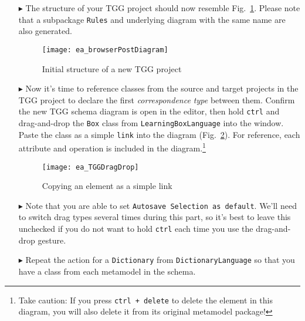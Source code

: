 \begin{itemize}
\item[$\blacktriangleright$] The structure of your TGG project should now resemble Fig.~\ref{ea:new_tgg_project}. Please note that a subpackage \texttt{Rules}
and underlying diagram with the same name are also generated.

\begin{figure}[htbp]
\begin{center}
  \texttt{[image: ea\_browserPostDiagram]}
  \caption{Initial structure of a new TGG project}  
  \label{ea:new_tgg_project}
\end{center}
\end{figure}
\end{itemize}
\clearpage

\begin{itemize}

\item[$\blacktriangleright$] Now it's time to reference classes from the source and target projects in the TGG project to declare the first \emph{correspondence
type} between them. Confirm the new TGG schema diagram is open in the editor, then hold \texttt{ctrl} and drag-and-drop the \texttt{Box} class from
\texttt{Learning\-Box\-Language} into the window. Paste the class as a simple \texttt{link} into the diagram (Fig.~\ref{ea:TGGdragDrop}). For reference, each
attribute and operation is included in the diagram.\footnote{Take caution: If you press \texttt{ctrl + delete} to delete the element in this diagram,
you will also delete it from its original metamodel package!}

\vspace{0.5cm}

\begin{figure}[htbp]
\begin{center}
  \texttt{[image: ea\_TGGDragDrop]}
  \caption{Copying an element as a simple link} 
  \label{ea:TGGdragDrop}
\end{center}
\end{figure}

\item[$\blacktriangleright$] Note that you are able to set \texttt{Autosave Selection as default}. We'll need to switch drag types several times during this
part, so it's best to leave this unchecked if you do not want to hold \texttt{ctrl} each time you use the drag-and-drop gesture.

\vspace{0.5cm}

\item[$\blacktriangleright$] Repeat the action for a \texttt{Dictionary} from \texttt{DictionaryLanguage} so that you have a class from each metamodel in the
schema.


\end{itemize}
